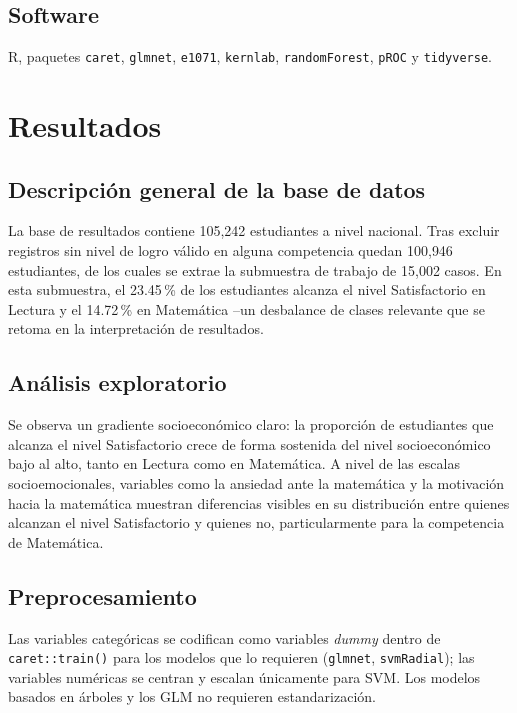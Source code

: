 \documentclass[11pt]{article}
\begin{document}
\subsection{Software}

R, paquetes \texttt{caret}, \texttt{glmnet}, \texttt{e1071},
\texttt{kernlab}, \texttt{randomForest}, \texttt{pROC} y \texttt{tidyverse}.

\newpage

\section{Resultados}

\subsection{Descripción general de la base de datos}

La base de resultados contiene 105{,}242 estudiantes a nivel nacional.
Tras excluir registros sin nivel de logro válido en alguna competencia
quedan 100{,}946 estudiantes, de los cuales se extrae la submuestra de
trabajo de 15{,}002 casos. En esta submuestra, el 23.45\,\% de los
estudiantes alcanza el nivel Satisfactorio en Lectura y el 14.72\,\% en
Matemática --un desbalance de clases relevante que se retoma en la
interpretación de resultados.

\subsection{Análisis exploratorio}

Se observa un gradiente socioeconómico claro: la proporción de
estudiantes que alcanza el nivel Satisfactorio crece de forma sostenida
del nivel socioeconómico bajo al alto, tanto en Lectura como en
Matemática. A nivel de las escalas socioemocionales, variables como la
ansiedad ante la matemática y la motivación hacia la matemática muestran
diferencias visibles en su distribución entre quienes alcanzan el nivel
Satisfactorio y quienes no, particularmente para la competencia de
Matemática.

\subsection{Preprocesamiento}

Las variables categóricas se codifican como variables \emph{dummy}
dentro de \texttt{caret::train()} para los modelos que lo requieren
(\texttt{glmnet}, \texttt{svmRadial}); las variables numéricas se
centran y escalan únicamente para SVM. Los modelos basados en árboles y
los GLM no requieren estandarización.
\end{document}
